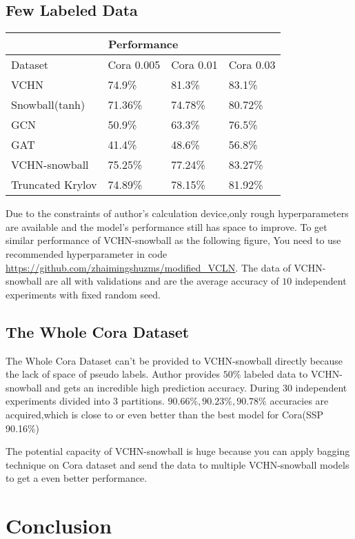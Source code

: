 \documentclass{article}
\begin{document}
\subsection{Few Labeled Data}
\begin{tabular}{ |p{3cm}||p{3cm}|p{3cm}|p{3cm}|  }
    \hline
    \multicolumn{4}{|c|}{Performance} \\
    \hline
    Dataset     & Cora 0.005 & Cora 0.01 &Cora 0.03\\
    \hline
    VCHN & 74.9\%   &81.3\%   &   83.1\%\\
    Snowball(tanh) &  71.36\%   & 74.78\%   &80.72\% \\
    GCN & 50.9\% & 63.3\%& 76.5\%\\
    GAT    &41.4\% & 48.6\%&  56.8\%\\
    VCHN-snowball &75.25\%   & 77.24\%& 83.27\% \\
    Truncated Krylov & 74.89\% & 78.15\%& 81.92\% \\
    \hline
   \end{tabular}
Due to the constraints of author's calculation device,only rough hyperparameters are available and the model's performance still has space to improve.
To get similar performance of VCHN-snowball as the following figure,
You need to use recommended hyperparameter in code \url{https://github.com/zhaimingshuzms/modified_VCLN}.
The data of VCHN-snowball are all with validations and are the average accuracy of $10$ independent experiments with fixed random seed.

\subsection{The Whole Cora Dataset}
The Whole Cora Dataset can't be provided to VCHN-snowball directly because the lack of space of pseudo labels.
Author provides $50\%$ labeled data to VCHN-snowball and gets an incredible high prediction accuracy.
During $30$ independent experiments divided into $3$ partitions. 
$90.66\%,90.23\%,90.78\%$ accuracies are acquired,which is close to or even better than the best model for Cora(SSP 90.16\%) \cite{SSP}

The potential capacity of VCHN-snowball is huge because you can apply bagging technique on Cora dataset and send the data to 
multiple VCHN-snowball models to get a even better performance.

\section{Conclusion}
\end{document}
